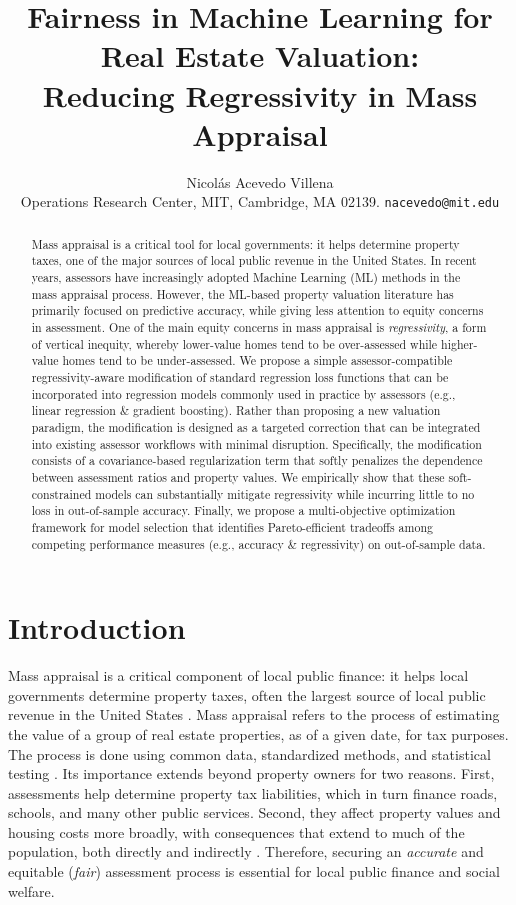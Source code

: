 \documentclass[12pt, draft]{article}
\title{\vspace{-5mm}Fairness in Machine Learning for Real Estate Valuation:\\ Reducing Regressivity in Mass Appraisal \vspace{0mm}}
\author{Nicolás Acevedo Villena\\
{\small Operations Research Center, MIT, Cambridge, MA 02139. \texttt{nacevedo@mit.edu}}}
\date{
\vspace{-8mm}
}
\theoremstyle{plain}
\theoremstyle{definition}
\newcommand{\1}{\mathbf{1}}
\begin{document}
\maketitle

\begin{abstract}

Mass appraisal is a critical tool for local governments: it helps determine property taxes, one of the major sources of local public revenue in the United States. In recent years, assessors have increasingly adopted Machine Learning (ML) methods in the mass appraisal process. However, the ML-based property valuation literature has primarily focused on predictive accuracy, while giving less attention to equity concerns in assessment. One of the main equity concerns in mass appraisal is \textit{regressivity}, a form of vertical inequity, whereby lower-value homes tend to be over-assessed while higher-value homes tend to be under-assessed. We propose a simple assessor-compatible regressivity-aware modification of standard regression loss functions that can be incorporated into regression models commonly used in practice by assessors (e.g., linear regression \& gradient boosting). Rather than proposing a new valuation paradigm, the modification is designed as a targeted correction that can be integrated into existing assessor workflows with minimal disruption. Specifically, the modification consists of a covariance-based regularization term that softly penalizes the dependence between assessment ratios and property values. We empirically show that these soft-constrained models can substantially mitigate regressivity while incurring little to no loss in out-of-sample accuracy. Finally, we propose a multi-objective optimization framework for model selection that identifies Pareto-efficient tradeoffs among competing performance measures (e.g., accuracy \& regressivity) on out-of-sample data.

\end{abstract}

\section{Introduction}

Mass appraisal is a critical component of local public finance: it helps local governments determine property taxes, often the largest source of local public revenue in the United States \cite{Berry2021}. Mass appraisal refers to the process of estimating the value of a group of real estate properties, as of a given date, for tax purposes. The process is done using common data, standardized methods, and statistical testing \cite{IAAO2025Mass}. Its importance extends beyond property owners for two reasons. First, assessments help determine property tax liabilities, which in turn finance roads, schools, and many other public services.  Second, they affect property values and housing costs more broadly, with consequences that extend to much of the population, both directly and indirectly \cite{Berry2021, Rootetal2023}. Therefore, securing an \textit{accurate} and equitable (\textit{fair}) assessment process is essential for local public finance and social welfare.
\end{document}
